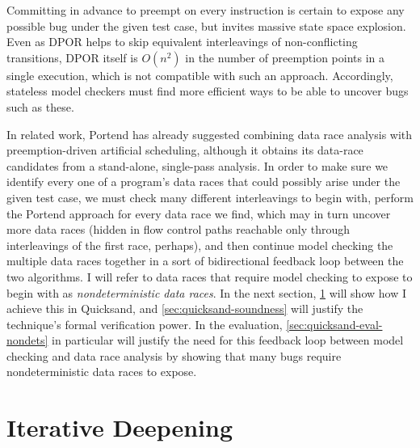 

Committing in advance to
preempt on every instruction is certain to expose any possible bug under the given test case,
but invites massive state space explosion.
Even as DPOR helps to skip equivalent interleavings of non-conflicting transitions,
DPOR itself is $O(n^2)$ in the number of preemption points in a single execution,
which is not compatible with such an approach.
Accordingly, stateless model checkers must find more efficient ways to be able to uncover bugs such as these.

In related work,
Portend \cite{portend} has already suggested combining data race analysis with preemption-driven artificial scheduling,
although it obtains its data-race candidates from a stand-alone, single-pass analysis.
In order to make sure we identify every one of a program's data races that could possibly arise under the given test case,
we must check many different interleavings to begin with,
perform the Portend approach for every data race we find,
which may in turn uncover more data races
(hidden in flow control paths reachable only through interleavings of the first race, perhaps),
and then continue model checking the multiple data races together
in a sort of bidirectional feedback loop between the two algorithms.
I will refer to data races that require model checking to expose to begin with as
{\em nondeterministic data races}. %
In the next section,
\cref{sec:quicksand-id} will show how I achieve this in Quicksand, and
\cref{sec:quicksand-soundness} will justify the technique's formal verification power.
In the evaluation, %
\cref{sec:quicksand-eval-nondets} in particular will justify the need
for this feedback loop between model checking and data race analysis
by showing that many bugs require nondeterministic data races to expose.


\section{Iterative Deepening}
\label{sec:quicksand-id}

